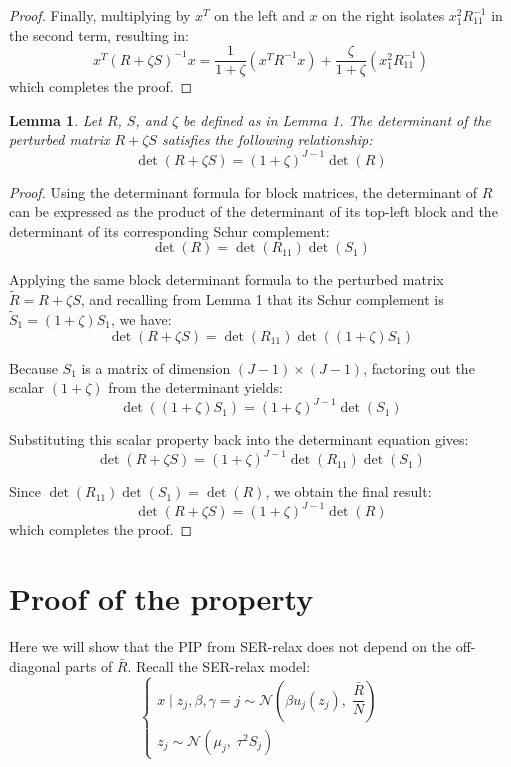 \documentclass[11pt]{article}
\newtheorem{lemma}{Lemma}
\begin{document}
\begin{proof}
Finally, multiplying by $x^T$ on the left and $x$ on the right isolates $x_1^2 R_{11}^{-1}$ in the second term, resulting in:
\[
x^T (R + \zeta S)^{-1} x = \frac{1}{1 + \zeta} \left( x^T R^{-1} x \right) + \frac{\zeta}{1 + \zeta} \left( x_1^2 R_{11}^{-1} \right)
\]
which completes the proof.
\end{proof}

\vspace{1em}

\begin{lemma}
Let $R$, $S$, and $\zeta$ be defined as in Lemma 1. The determinant of the perturbed matrix $R + \zeta S$ satisfies the following relationship:
\[
\det(R + \zeta S) = (1 + \zeta)^{J-1} \det(R)
\]
\end{lemma}

\begin{proof}
Using the determinant formula for block matrices, the determinant of $R$ can be expressed as the product of the determinant of its top-left block and the determinant of its corresponding Schur complement:
\[
\det(R) = \det(R_{11}) \det(S_1)
\]

Applying the same block determinant formula to the perturbed matrix $\tilde{R} = R + \zeta S$, and recalling from Lemma 1 that its Schur complement is $\tilde{S}_1 = (1 + \zeta) S_1$, we have:
\[
\det(R + \zeta S) = \det(R_{11}) \det((1 + \zeta) S_1)
\]

Because $S_1$ is a matrix of dimension $(J-1) \times (J-1)$, factoring out the scalar $(1 + \zeta)$ from the determinant yields:
\[
\det((1 + \zeta) S_1) = (1 + \zeta)^{J-1} \det(S_1)
\]

Substituting this scalar property back into the determinant equation gives:
\[
\det(R + \zeta S) = (1 + \zeta)^{J-1} \det(R_{11}) \det(S_1)
\]

Since $\det(R_{11}) \det(S_1) = \det(R)$, we obtain the final result:
\[
\det(R + \zeta S) = (1 + \zeta)^{J-1} \det(R)
\]
which completes the proof.
\end{proof}


\section{Proof of the property}
Here we will show that the PIP from SER-relax does not depend on the off-diagonal parts of $\bar{R}$. Recall the SER-relax model:
\[
\begin{cases}
x  \mid z_j, \beta, \gamma=j
  \sim \mathcal{N} \left(\beta u_j(z_j),\; \dfrac{\bar{R}}{N}\right) \\
z_j \sim \mathcal{N}(\mu_j,\;\tau^2 S_j)
\end{cases}
\]
\end{document}
